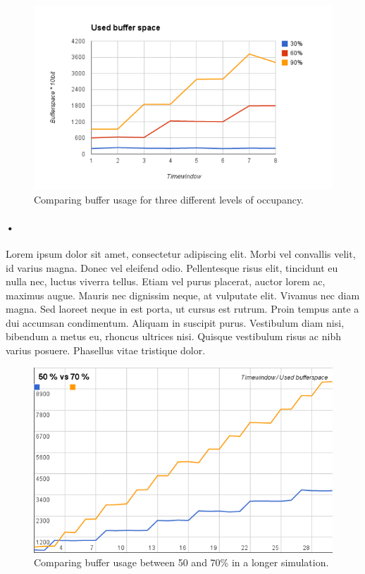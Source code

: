 \documentclass[a4paper, 12pt]{report}
\begin{document}
\begin{figure}[h!]
	\centering
		\includegraphics[width=1.0\textwidth]{images/results-flat30-60-80-8tf.png}
		\caption{Comparing buffer usage for three different levels of occupancy.}
		\label{fig:results-30-60-90}
\end{figure}

\paragraph{•} %
Lorem ipsum dolor sit amet, consectetur adipiscing elit. Morbi vel convallis velit, id varius magna. Donec vel eleifend odio. Pellentesque risus elit, tincidunt eu nulla nec, luctus viverra tellus. Etiam vel purus placerat, auctor lorem ac, maximus augue. Mauris nec dignissim neque, at vulputate elit. Vivamus nec diam magna. Sed laoreet neque in est porta, ut cursus est rutrum. Proin tempus ante a dui accumsan condimentum. Aliquam in suscipit purus. Vestibulum diam nisi, bibendum a metus eu, rhoncus ultrices nisi. Quisque vestibulum risus ac nibh varius posuere. Phasellus vitae tristique dolor.

\begin{figure}[h!]
	\centering
		\includegraphics[width=1.0\textwidth]{images/50v70.png}
		\caption{Comparing buffer usage between 50 and 70\% in a longer simulation.}
		\label{fig:results-50-70}
\end{figure}
\end{document}

